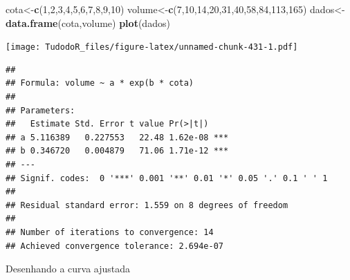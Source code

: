 \documentclass[
]{book}
\newenvironment{Shaded}{\begin{snugshade}}{\end{snugshade}}
\newcommand{\CommentTok}[1]{\textcolor[rgb]{0.56,0.35,0.01}{\textit{#1}}}
\newcommand{\DataTypeTok}[1]{\textcolor[rgb]{0.13,0.29,0.53}{#1}}
\newcommand{\DecValTok}[1]{\textcolor[rgb]{0.00,0.00,0.81}{#1}}
\newcommand{\KeywordTok}[1]{\textcolor[rgb]{0.13,0.29,0.53}{\textbf{#1}}}
\newcommand{\NormalTok}[1]{#1}
\newcommand{\OperatorTok}[1]{\textcolor[rgb]{0.81,0.36,0.00}{\textbf{#1}}}
\newcommand{\StringTok}[1]{\textcolor[rgb]{0.31,0.60,0.02}{#1}}
\begin{document}
\begin{Shaded}
\begin{Highlighting}[]
\NormalTok{cota<-}\KeywordTok{c}\NormalTok{(}\DecValTok{1}\NormalTok{,}\DecValTok{2}\NormalTok{,}\DecValTok{3}\NormalTok{,}\DecValTok{4}\NormalTok{,}\DecValTok{5}\NormalTok{,}\DecValTok{6}\NormalTok{,}\DecValTok{7}\NormalTok{,}\DecValTok{8}\NormalTok{,}\DecValTok{9}\NormalTok{,}\DecValTok{10}\NormalTok{) }
\NormalTok{volume<-}\KeywordTok{c}\NormalTok{(}\DecValTok{7}\NormalTok{,}\DecValTok{10}\NormalTok{,}\DecValTok{14}\NormalTok{,}\DecValTok{20}\NormalTok{,}\DecValTok{31}\NormalTok{,}\DecValTok{40}\NormalTok{,}\DecValTok{58}\NormalTok{,}\DecValTok{84}\NormalTok{,}\DecValTok{113}\NormalTok{,}\DecValTok{165}\NormalTok{) }
\NormalTok{dados<-}\KeywordTok{data.frame}\NormalTok{(cota,volume) }
\KeywordTok{plot}\NormalTok{(dados)}
\end{Highlighting}
\end{Shaded}

\texttt{[image: TudodoR\_files/figure-latex/unnamed-chunk-431-1.pdf]}

\begin{Shaded}
\end{Shaded}

\begin{verbatim}
## 
## Formula: volume ~ a * exp(b * cota)
## 
## Parameters:
##   Estimate Std. Error t value Pr(>|t|)    
## a 5.116389   0.227553   22.48 1.62e-08 ***
## b 0.346720   0.004879   71.06 1.71e-12 ***
## ---
## Signif. codes:  0 '***' 0.001 '**' 0.01 '*' 0.05 '.' 0.1 ' ' 1
## 
## Residual standard error: 1.559 on 8 degrees of freedom
## 
## Number of iterations to convergence: 14 
## Achieved convergence tolerance: 2.694e-07
\end{verbatim}

Desenhando a curva ajustada
\end{document}
